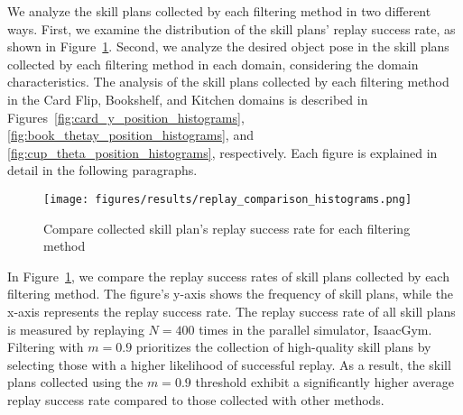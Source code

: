 



We analyze the skill plans collected by each filtering method in two different ways. First, we examine the distribution of the skill plans' replay success rate, as shown in Figure~\ref{fig:replay_success_dataQ}. Second, we analyze the desired object pose in the skill plans collected by each filtering method in each domain, considering the domain characteristics. The analysis of the skill plans collected by each filtering method in the Card Flip, Bookshelf, and Kitchen domains is described in Figures~\ref{fig:card_y_position_histograms}, \ref{fig:book_thetay_position_histograms}, and \ref{fig:cup_theta_position_histograms}, respectively. Each figure is explained in detail in the following paragraphs.

\begin{figure}[h!] %
\centering
\texttt{[image: figures/results/replay\_comparison\_histograms.png]}
\caption{Compare collected skill plan's replay success rate for each filtering method} %
\label{fig:replay_success_dataQ} %
\end{figure}

In Figure~\ref{fig:replay_success_dataQ}, we compare the replay success rates of skill plans collected by each filtering method. The figure's y-axis shows the frequency of skill plans, while the x-axis represents the replay success rate. The replay success rate of all skill plans is measured by replaying \( N = 400 \) times in the parallel simulator, IsaacGym. Filtering with \( m = 0.9 \) prioritizes the collection of high-quality skill plans by selecting those with a higher likelihood of successful replay. As a result, the skill plans collected using the \( m=0.9 \) threshold exhibit a significantly higher average replay success rate compared to those collected with other methods.  %


